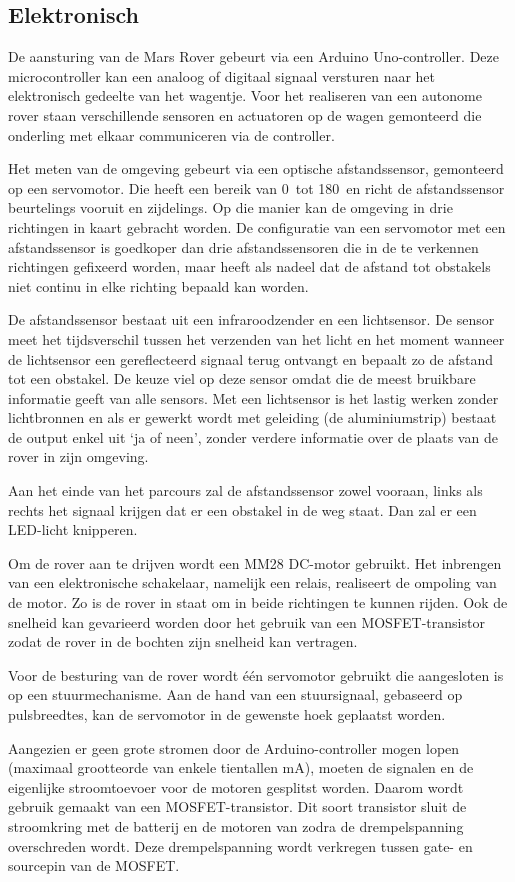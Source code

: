  
\subsection{Elektronisch}
De aansturing van de Mars Rover gebeurt via een Arduino Uno-controller. Deze 
microcontroller kan een analoog of digitaal signaal versturen naar het 
elektronisch gedeelte van het wagentje. Voor het realiseren van een autonome 
rover staan verschillende sensoren en actuatoren op de wagen gemonteerd die 
onderling met elkaar communiceren via de controller.

Het meten van de omgeving gebeurt via een optische afstandssensor, gemonteerd op 
een servomotor. Die heeft een bereik van 0\degree~tot 180\degree~en richt de afstandssensor 
beurtelings vooruit en zijdelings. Op die manier kan de omgeving in drie 
richtingen in kaart gebracht worden. De configuratie van een servomotor met een 
afstandssensor is goedkoper dan drie afstandssensoren die in de te verkennen 
richtingen gefixeerd worden, maar heeft als nadeel dat de afstand tot obstakels 
niet continu in elke richting bepaald kan worden.

De afstandssensor bestaat uit een infraroodzender en een lichtsensor. De sensor 
meet het tijdsverschil tussen het verzenden van het licht en het moment wanneer 
de lichtsensor een gereflecteerd signaal terug ontvangt en bepaalt zo de afstand 
tot een obstakel.\cite{SharpDistanceSensor} De keuze viel op deze sensor omdat die de meest bruikbare 
informatie geeft van alle sensors. Met een lichtsensor is het lastig werken 
zonder lichtbronnen en als er gewerkt wordt met geleiding (de aluminiumstrip) 
bestaat de output enkel uit ‘ja of neen’, zonder verdere informatie over de 
plaats van de rover in zijn omgeving.

Aan het einde van het parcours zal de afstandssensor zowel vooraan, links als 
rechts het signaal krijgen dat er een obstakel in de weg staat. Dan zal er een 
LED-licht knipperen.

Om de rover aan te drijven wordt een MM28 DC-motor gebruikt. Het inbrengen van 
een elektronische schakelaar, namelijk een relais, realiseert de ompoling van de 
motor. Zo is de rover in staat om in beide richtingen te kunnen rijden. Ook de 
snelheid kan gevarieerd worden door het gebruik van een MOSFET-transistor zodat 
de rover in de bochten zijn snelheid kan vertragen.

Voor de besturing van de rover wordt één servomotor gebruikt die aangesloten is 
op een stuurmechanisme. Aan de hand van een stuursignaal, gebaseerd op 
pulsbreedtes, kan de servomotor in de gewenste hoek geplaatst worden.

Aangezien er geen grote stromen door de Arduino-controller mogen lopen (maximaal 
grootteorde van enkele tientallen mA), moeten de signalen en de eigenlijke 
stroomtoevoer voor de motoren gesplitst worden. Daarom wordt gebruik gemaakt van 
een MOSFET-transistor. Dit soort transistor sluit de stroomkring met de batterij 
en de motoren van zodra de drempelspanning overschreden wordt. Deze 
drempelspanning wordt verkregen tussen gate- en sourcepin van de MOSFET.\cite{MosfetBitwizard} 
